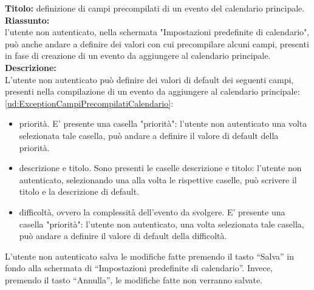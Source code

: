 \begin{listaPersonale}[UC]{}
\begin{listaPersonale2}[UC] {}
        \textbf{Titolo: } definizione di campi precompilati di un evento del calendario principale. \\
        \textbf{Riassunto: } \\ l'utente non autenticato, nella schermata "Impostazioni predefinite di calendario", può anche andare a definire dei valori con cui precompilare alcuni campi, presenti in fase di creazione di un evento da aggiungere al calendario principale. \\
        \textbf{Descrizione: } \\
        L'utente non autenticato può definire dei valori di default dei seguenti campi, presenti nella compilazione di un evento da aggiungere al calendario principale: \ref{ud:ExceptionCampiPrecompilatiCalendario}:
        \begin{itemize}
            \item priorità. E' presente una casella "priorità": l'utente non autenticato una volta selezionata tale casella, può andare a definire il valore di default della priorità.
            \item descrizione e titolo. Sono presenti le caselle descrizione e titolo: l'utente non autenticato, selezionando una alla volta le rispettive caselle, può scrivere il titolo e la descrizione di default.
            \item difficoltà, ovvero la complessità dell'evento da svolgere. E' presente una casella "priorità": l'utente non autenticato, una volta selezionata tale casella, può andare a definire il valore di default della difficoltà.
        \end{itemize}
        L'utente non autenticato salva le modifiche fatte premendo il tasto “Salva” in fondo alla schermata di “Impostazioni predefinite di calendario”. Invece, premendo il tasto “Annulla”, le modifiche fatte non verranno salvate.
        

\end{listaPersonale2}
\end{listaPersonale}
